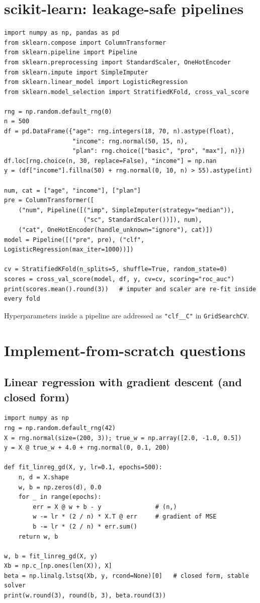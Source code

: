 \section{scikit-learn: leakage-safe pipelines}
\begin{lstlisting}[style=python]
import numpy as np, pandas as pd
from sklearn.compose import ColumnTransformer
from sklearn.pipeline import Pipeline
from sklearn.preprocessing import StandardScaler, OneHotEncoder
from sklearn.impute import SimpleImputer
from sklearn.linear_model import LogisticRegression
from sklearn.model_selection import StratifiedKFold, cross_val_score

rng = np.random.default_rng(0)
n = 500
df = pd.DataFrame({"age": rng.integers(18, 70, n).astype(float),
                   "income": rng.normal(50, 15, n),
                   "plan": rng.choice(["basic", "pro", "max"], n)})
df.loc[rng.choice(n, 30, replace=False), "income"] = np.nan
y = (df["income"].fillna(50) + rng.normal(0, 10, n) > 55).astype(int)

num, cat = ["age", "income"], ["plan"]
pre = ColumnTransformer([
    ("num", Pipeline([("imp", SimpleImputer(strategy="median")),
                      ("sc", StandardScaler())]), num),
    ("cat", OneHotEncoder(handle_unknown="ignore"), cat)])
model = Pipeline([("pre", pre), ("clf", LogisticRegression(max_iter=1000))])

cv = StratifiedKFold(n_splits=5, shuffle=True, random_state=0)
scores = cross_val_score(model, df, y, cv=cv, scoring="roc_auc")
print(scores.mean().round(3))   # imputer and scaler are re-fit inside every fold
\end{lstlisting}
Hyperparameters inside a pipeline are addressed as \texttt{"clf\_\_C"} in \texttt{GridSearchCV}.

\section{Implement-from-scratch questions}

\subsection{Linear regression with gradient descent (and closed form)}
\begin{lstlisting}[style=python]
import numpy as np
rng = np.random.default_rng(42)
X = rng.normal(size=(200, 3)); true_w = np.array([2.0, -1.0, 0.5])
y = X @ true_w + 4.0 + rng.normal(0, 0.1, 200)

def fit_linreg_gd(X, y, lr=0.1, epochs=500):
    n, d = X.shape
    w, b = np.zeros(d), 0.0
    for _ in range(epochs):
        err = X @ w + b - y               # (n,)
        w -= lr * (2 / n) * X.T @ err     # gradient of MSE
        b -= lr * (2 / n) * err.sum()
    return w, b

w, b = fit_linreg_gd(X, y)
Xb = np.c_[np.ones(len(X)), X]
beta = np.linalg.lstsq(Xb, y, rcond=None)[0]   # closed form, stable solver
print(w.round(3), round(b, 3), beta.round(3))
\end{lstlisting}

